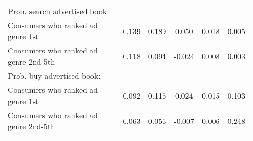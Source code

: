 \begin{center}
\begin{tabular}{lccccc}
\hspace{5pt} Prob. search advertised book: &  &  &  &  & \\
\hspace{5pt} Consumers who ranked ad genre 1st & 0.139 & 0.189 & 0.050 & 0.018 & 0.005\\
\hspace{5pt} Consumers who ranked ad genre 2nd-5th & 0.118 & 0.094 & -0.024 & 0.008 & 0.003\\
\hspace{5pt} Prob. buy advertised book: &  &  &  &  & \\
\hspace{5pt} Consumers who ranked ad genre 1st & 0.092 & 0.116 & 0.024 & 0.015 & 0.103\\
\hspace{5pt} Consumers who ranked ad genre 2nd-5th & 0.063 & 0.056 & -0.007 & 0.006 & 0.248\\
\noalign{\smallskip}\hline\end{tabular}\\
\end{center}
